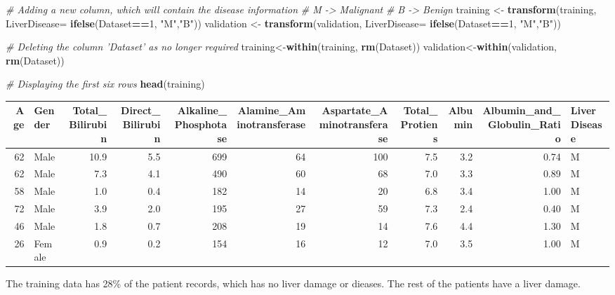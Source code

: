 \documentclass[]{article}
\newenvironment{Shaded}{\begin{snugshade}}{\end{snugshade}}
\newcommand{\CommentTok}[1]{\textcolor[rgb]{0.56,0.35,0.01}{\textit{#1}}}
\newcommand{\DataTypeTok}[1]{\textcolor[rgb]{0.13,0.29,0.53}{#1}}
\newcommand{\DecValTok}[1]{\textcolor[rgb]{0.00,0.00,0.81}{#1}}
\newcommand{\FloatTok}[1]{\textcolor[rgb]{0.00,0.00,0.81}{#1}}
\newcommand{\KeywordTok}[1]{\textcolor[rgb]{0.13,0.29,0.53}{\textbf{#1}}}
\newcommand{\NormalTok}[1]{#1}
\newcommand{\OperatorTok}[1]{\textcolor[rgb]{0.81,0.36,0.00}{\textbf{#1}}}
\newcommand{\StringTok}[1]{\textcolor[rgb]{0.31,0.60,0.02}{#1}}
\begin{document}
\begin{Shaded}
\begin{Highlighting}[]
\CommentTok{# Adding a new column, which will contain the disease information}
\CommentTok{# M -> Malignant}
\CommentTok{# B -> Benign}
\NormalTok{training <-}\StringTok{ }\KeywordTok{transform}\NormalTok{(training, }\DataTypeTok{LiverDisease=} \KeywordTok{ifelse}\NormalTok{(Dataset}\OperatorTok{==}\DecValTok{1}\NormalTok{, }\StringTok{"M"}\NormalTok{,}\StringTok{"B"}\NormalTok{))}
\NormalTok{validation <-}\StringTok{ }\KeywordTok{transform}\NormalTok{(validation, }\DataTypeTok{LiverDisease=} \KeywordTok{ifelse}\NormalTok{(Dataset}\OperatorTok{==}\DecValTok{1}\NormalTok{, }\StringTok{"M"}\NormalTok{,}\StringTok{"B"}\NormalTok{))}

\CommentTok{# Deleting the column 'Dataset' as no longer required}
\NormalTok{training<-}\KeywordTok{within}\NormalTok{(training, }\KeywordTok{rm}\NormalTok{(Dataset))}
\NormalTok{validation<-}\KeywordTok{within}\NormalTok{(validation, }\KeywordTok{rm}\NormalTok{(Dataset))}

\CommentTok{# Displaying the first six rows}
\KeywordTok{head}\NormalTok{(training)}
\end{Highlighting}
\end{Shaded}

\begin{longtable}[]{@{}rlrrrrrrrrl@{}}
\toprule
Age & Gender & Total\_Bilirubin & Direct\_Bilirubin &
Alkaline\_Phosphotase & Alamine\_Aminotransferase &
Aspartate\_Aminotransferase & Total\_Protiens & Albumin &
Albumin\_and\_Globulin\_Ratio & LiverDisease\tabularnewline
\midrule
\endhead
62 & Male & 10.9 & 5.5 & 699 & 64 & 100 & 7.5 & 3.2 & 0.74 &
M\tabularnewline
62 & Male & 7.3 & 4.1 & 490 & 60 & 68 & 7.0 & 3.3 & 0.89 &
M\tabularnewline
58 & Male & 1.0 & 0.4 & 182 & 14 & 20 & 6.8 & 3.4 & 1.00 &
M\tabularnewline
72 & Male & 3.9 & 2.0 & 195 & 27 & 59 & 7.3 & 2.4 & 0.40 &
M\tabularnewline
46 & Male & 1.8 & 0.7 & 208 & 19 & 14 & 7.6 & 4.4 & 1.30 &
M\tabularnewline
26 & Female & 0.9 & 0.2 & 154 & 16 & 12 & 7.0 & 3.5 & 1.00 &
M\tabularnewline
\bottomrule
\end{longtable}

The training data has 28\% of the patient records, which has no liver
damage or dieases. The rest of the patients have a liver damage.

\begin{Shaded}
\end{Shaded}
\end{document}
